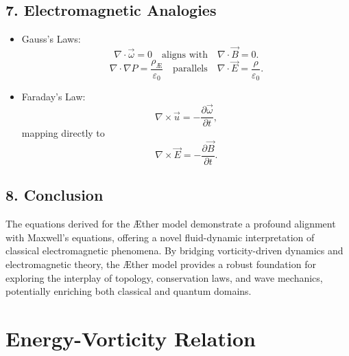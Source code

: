 \documentclass[a4paper,10pt]{article}
\begin{document}
        \subsection*{7. Electromagnetic Analogies}
        \begin{itemize}
            \item Gauss's Laws:
            \begin{equation*}
                \nabla \cdot \vec{\omega} = 0 \quad \text{aligns with} \quad \nabla \cdot \vec{B} = 0.
            \end{equation*}
            \begin{equation*}
                \nabla \cdot \nabla P = \frac{\rho_\text{Æ}}{\varepsilon_0} \quad \text{parallels} \quad \nabla \cdot \vec{E} = \frac{\rho}{\varepsilon_0}.
            \end{equation*}
            \item Faraday's Law:
            \begin{equation*}
                \nabla \times \vec{u} = -\frac{\partial \vec{\omega}}{\partial t},
            \end{equation*}
            mapping directly to
            \begin{equation*}
                \nabla \times \vec{E} = -\frac{\partial \vec{B}}{\partial t}.
            \end{equation*}
        \end{itemize}

        \subsection*{8. Conclusion}
        The equations derived for the Æther model demonstrate a profound alignment with Maxwell's equations, offering a novel fluid-dynamic interpretation of classical electromagnetic phenomena. By bridging vorticity-driven dynamics and electromagnetic theory, the Æther model provides a robust foundation for exploring the interplay of topology, conservation laws, and wave mechanics, potentially enriching both classical and quantum domains.

    

    \section{Energy-Vorticity Relation}
\end{document}
